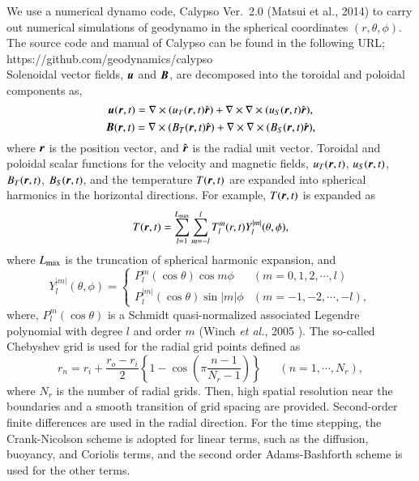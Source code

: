 We use a numerical dynamo code, Calypso Ver.~2.0 
{\color{red}
(Matsui et al., 2014) to carry out numerical simulations of geodynamo in the spherical coordinates $(r, \theta, \phi)$.
}
%
The source code and manual of Calypso can be found in the following URL;\\
https://github.com/geodynamics/calypso\\
%
Solenoidal vector fields, $\mbox{\boldmath$u$}$ and $\mbox{\boldmath$B$}$, are decomposed into the toroidal and poloidal components
{\color{red}
as,
%
\begin{equation}
    \mbox{\boldmath$u$} (\mbox{\boldmath$r$}, t) = \nabla \times ( u_T (\mbox{\boldmath$r$}, t) \hat{\mbox{\boldmath$r$}} ) + \nabla \times \nabla \times ( u_S (\mbox{\boldmath$r$}, t) \hat{\mbox{\boldmath$r$}} ),
\label{eq:uT_uS}
\end{equation}
%
\begin{equation}
    \mbox{\boldmath$B$} (\mbox{\boldmath$r$}, t) = \nabla \times ( B_T (\mbox{\boldmath$r$}, t) \hat{\mbox{\boldmath$r$}} ) + \nabla \times \nabla \times ( B_S (\mbox{\boldmath$r$}, t) \hat{\mbox{\boldmath$r$}} ),
\label{eq:BT_BS}
\end{equation}
where $\mbox{\boldmath$r$}$ is the position vector, and $\hat{\mbox{\boldmath$r$}}$ is the radial unit vector.
}
{\color{red}
Toroidal and poloidal scalar functions for the velocity and magnetic fields, $u_T (\mbox{\boldmath$r$}, t)$, $u_S (\mbox{\boldmath$r$}, t)$, $B_T (\mbox{\boldmath$r$}, t)$, $B_S (\mbox{\boldmath$r$}, t)$, and the temperature $T (\mbox{\boldmath$r$}, t)$
}
are expanded into spherical harmonics in the horizontal directions.
{\color{red}
For example, $T (\mbox{\boldmath$r$}, t)$ is expanded as
%
\begin{equation}
    T(\mbox{\boldmath$r$}, t) = \sum_{l=1}^{L_{\rm max}} \sum_{m=-l}^{l} T_l^m (r, t) Y_l^{|m|} (\theta, \phi),
\label{eq:T_expansion}
\end{equation}
%
where $L_{\rm max}$ is the truncation of spherical harmonic expansion, and
%
\begin{equation}
Y_l^{|m|} (\theta, \phi) = \left\{
 \begin{array}{ll}
 P_l^m(\cos\theta)\cos m\phi & (m = 0, 1, 2, \cdots, l)
 \\
 P_l^{|m|}(\cos\theta)\sin |m|\phi & (m = -1, -2, \cdots, -l) ,
 \end{array}
\right.
\label{eq:def_of_Ylm}
\end{equation}
%
where, $P_l^m (\cos \theta )$ is a Schmidt quasi-normalized associated Legendre polynomial with degree $l$ and order $m$ 
{\color{blue} (Winch {\it et al.}, 2005 \cite{Winch:2005}).}
The so-called Chebyshev grid is used for the radial grid points defined as
%
\begin{equation}
r_n = r_i + \frac{r_o - r_i}{2} \left\{ 1 - \cos \left( \pi \frac{n-1}{N_r-1} \right) \right\} ~~\;\;\;\; (n = 1, \cdots , N_r) ,
\label{eq:def_of_rn}
\end{equation}
%
where $N_r$ is the number of radial grids.
Then, high spatial resolution near the boundaries and a smooth transition of grid spacing are provided.
}
Second-order finite differences are used in the radial direction.
For the time stepping, the Crank-Nicolson scheme is adopted for linear terms, such as the diffusion, buoyancy, and Coriolis terms, and the second order Adams-Bashforth scheme is used for the other terms.

